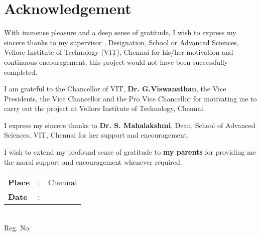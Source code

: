 \chapter*{Acknowledgement}
%
With immense pleasure and a deep sense of gratitude, I wish to express my sincere thanks to my supervisor \textbf{\theguide}, Designation, School or Advanced Sciences, Vellore Institute of Technology (VIT), Chennai for his/her motivation and continuous encouragement, this project would not have been successfully completed.

I am grateful to the Chancellor of VIT, \textbf{Dr. G.Viswanathan}, the Vice Presidents, the Vice Chancellor and the Pro Vice Chancellor for motivating me to carry out the project at Vellore Institute of Technology, Chennai.

I express my sincere thanks to \textbf{Dr. S. Mahalakshmi}, Dean, School of Advanced Sciences, VIT, Chennai  for her support and encouragement. 

I wish to extend my profound sense of gratitude to \textbf{my parents} for providing me the moral support and encouragement whenever required.   


\vspace{3\baselineskip}

\begin{minipage}{.5\textwidth}
\raggedright
\begin{tabular}{lcl}
	\textbf{Place}  & : & Chennai \\
	\textbf{Date} & : &
\end{tabular}
\end{minipage}%
\begin{minipage}{.5\textwidth}
	\raggedleft
	\thestudent\\
	Reg. No: \theregno\\
\end{minipage}

 

